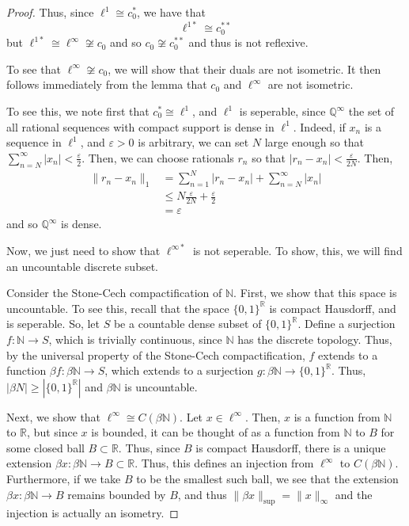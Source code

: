 \documentclass[fontsize=11pt]{scrartcl} %
\numberwithin{equation}{section} %
\numberwithin{figure}{section} %
\numberwithin{table}{section} %
\newcommand{\R}{\mathbb{R}}
\newcommand{\Q}{\mathbb{Q}}
\newcommand{\N}{\mathbb{N}}
\begin{document}
\begin{proof}
    Thus, since $\ell^1\cong c_0^*$, we have that
    \[
        \ell^{1*}\cong c_0^{**}
    \]
    but $\ell^{1*}\cong \ell^{\infty}\not\cong c_0$ and so $c_0\not\cong
    c_0^{**}$ and thus is not reflexive.

    To see that $\ell^{\infty}\not\cong c_0$, we will show that their duals are
    not isometric. It then follows immediately from the lemma that $c_0$ and
    $\ell^{\infty}$ are not isometric.

    To see this, we note first that $c_0^*\cong \ell^1$, and $\ell^1$ is
    seperable, since $\Q^{\infty}$ the set of all rational sequences with compact
    support is dense in $\ell^1$. Indeed, if $x_n$ is a sequence in $\ell^1$,
    and $\varepsilon>0$ is arbitrary, we can set $N$ large enough so that
    $\sum_{n=N}^{\infty}|x_n|< \frac{\varepsilon}{2}$. Then, we can choose rationals $r_n$
    so that $|r_n-x_n|<\frac{\varepsilon}{2N}$.
    Then,
    \[
        \begin{aligned}
        \|r_n-x_n\|_1 &= \sum_{n=1}^N|r_n-x_n| + \sum_{n=N}^{\infty}|x_n|\\
        &\leq N\frac{\varepsilon}{2N} + \frac{\varepsilon}{2}\\
        &=\varepsilon
    \end{aligned}
    \]
    and so $\Q^{\infty}$ is dense.

    Now, we just need to show that $\ell^{\infty *}$ is not seperable. To show,
    this, we will find an uncountable discrete subset.

    Consider the Stone-Cech compactification of $\N$. First, we show that this
    space is uncountable. To see this, recall that the space $\{0,1\}^{\R}$ is
    compact Hausdorff, and is seperable. So, let $S$ be a countable dense subset
    of $\{0,1\}^{\R}$. Define a surjection $f:\N\to S$, which is trivially
    continuous, since $\N$ has the discrete topology. Thus, by the universal
    property of the Stone-Cech compactification, $f$ extends to a function
    $\beta f:\beta \N\to S$, which extends to a surjection $g:\beta\N \to
    \{0,1\}^{\R}$. Thus, $|\beta N| \geq |\{0,1\}^{\R}|$ and $\beta \N$ is
    uncountable. 

    Next, we show that $\ell^{\infty}\cong C(\beta \N)$. Let $x\in
    \ell^{\infty}$. Then, $x$ is a function from $\N$ to $\R$, but since $x$ is
    bounded, it can be thought of as a function from $\N$ to $B$ for some closed
    ball $B\subset \R$. Thus, since $B$ is compact Hausdorff, there is a unique
    extension $\beta x:\beta \N\to B\subset \R$. Thus, this defines an injection
    from $\ell^{\infty}$ to $C(\beta \N)$.
    Furthermore, if we take $B$ to be the smallest such ball, we see that the
    extension $\beta x:\beta \N\to B$ remains bounded by $B$, and thus $\|\beta
    x\|_{\sup} = \|x\|_{\infty}$ and the injection is actually an isometry.


\end{proof}
\end{document}
